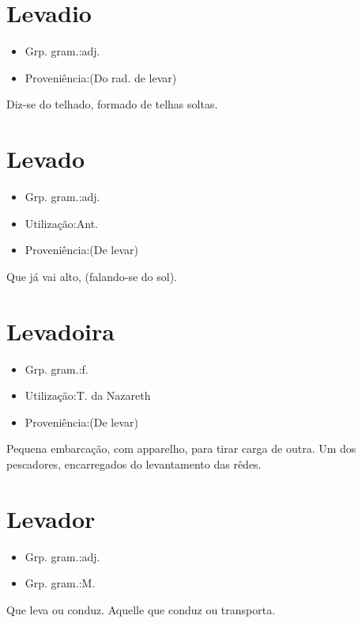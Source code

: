 \section{Levadio}
\begin{itemize}
\item {Grp. gram.:adj.}
\end{itemize}
\begin{itemize}
\item {Proveniência:(Do rad. de \textunderscore levar\textunderscore )}
\end{itemize}
Diz-se do telhado, formado de telhas soltas.
\section{Levado}
\begin{itemize}
\item {Grp. gram.:adj.}
\end{itemize}
\begin{itemize}
\item {Utilização:Ant.}
\end{itemize}
\begin{itemize}
\item {Proveniência:(De \textunderscore levar\textunderscore )}
\end{itemize}
Que já vai alto, (falando-se do sol).
\section{Levadoira}
\begin{itemize}
\item {Grp. gram.:f.}
\end{itemize}
\begin{itemize}
\item {Utilização:T. da Nazareth}
\end{itemize}
\begin{itemize}
\item {Proveniência:(De \textunderscore levar\textunderscore )}
\end{itemize}
Pequena embarcação, com apparelho, para tirar carga de outra.
Um dos pescadores, encarregados do levantamento das rêdes.
\section{Levador}
\begin{itemize}
\item {Grp. gram.:adj.}
\end{itemize}
\begin{itemize}
\item {Grp. gram.:M.}
\end{itemize}
Que leva ou conduz.
Aquelle que conduz ou transporta.
